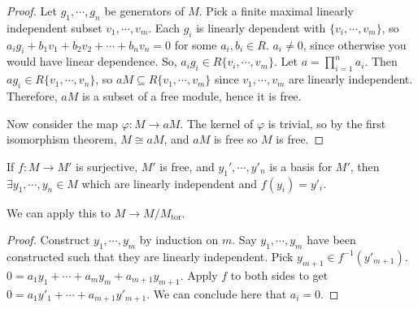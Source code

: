 \documentclass[a4paper,twoside,master.tex]{subfiles}
\begin{document}
\begin{proof}
    Let $ g_1, \cdots, g_n $ be generators of $ M $. Pick a finite maximal linearly independent subset $ v_1, \cdots, v_m $. Each $ g_i $ is linearly dependent with $ \{v_i, \cdots, v_m\} $, so $ a_i g_i + b_1 v_1 + b_2 v_2 + \cdots + b_n v_n = 0 $ for some $ a_i, b_i \in R $. $ a_i \neq 0 $, since otherwise you would have linear dependence. So, $ a_i g_i \in R \{v_i, \cdots, v_m\} $. Let $ a = \prod_{i=1}^{n} a_i $. Then $ ag_i \in R \{v_1, \cdots, v_n\} $, so $ aM\subseteq R \{v_1,\cdots, v_m\} $ since $ v_1,\cdots, v_m $ are linearly independent. Therefore, $ aM $ is a subset of a free module, hence it is free.

    Now consider the map $ \varphi \colon M \to aM $. The kernel of $ \varphi $ is trivial, so by the first isomorphism theorem, $ M \cong aM $, and $ aM $ is free so $ M $ is free.
\end{proof}
\begin{lemma}
    If $ f\colon M \to M' $ is surjective, $ M' $ is free, and $ y_1', \cdots, y'_n $ is a basis for $ M' $, then $ \exists y_1, \cdots, y_n \in M $ which are linearly independent and $ f(y_i) = y'_i $. 
\end{lemma}
We can apply this to $ M \to M/M_{\text{tor}} $. 
\begin{proof}
    Construct $ y_1, \cdots, y_m $ by induction on $ m $. Say $ y_1, \cdots, y_m $ have been constructed such that they are linearly independent. Pick $ y_{m+1} \in f^{-1}(y'_{m+1}) $. $ 0 = a_1 y_1 + \cdots + a_m y_m + a_{m+1} y_{m+1} $. Apply $ f $ to both sides to get $ 0 = a_1 y'_1 + \cdots + a_{m+1} y'_{m+1} $. We can conclude here that $ a_i = 0 $.
\end{proof}
\end{document}
